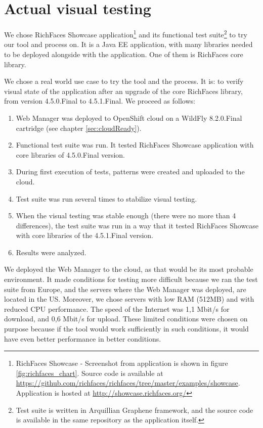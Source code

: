 \documentclass[11pt,oneside,final]{fithesis2}
\begin{document}
  \section{Actual visual testing}
  We chose RichFaces Showcase 
  application\footnote{RichFaces Showcase - Screenshot from application is shown in figure \ref{fig:richfaces_chart}. 
  Source code is available at \url{https://github.com/richfaces/richfaces/tree/master/examples/showcase}. 
  Application is hosted at \url{http://showcase.richfaces.org/}} 
  and its functional test suite\footnote{Test suite is written in Arquillian Graphene framework, and the source code is 
  available in the same repository as the application itself.} to try our tool and process on. It is a Java EE application, with
  many libraries needed to be deployed alongside with the application. One of them is RichFaces core library.
  
  We chose a real world use case to try the tool and the process. It is: to verify visual state of the application after an upgrade of 
  the core RichFaces library, from version 4.5.0.Final to 4.5.1.Final. We proceed as follows:
  
  \begin{enumerate}
   \item Web Manager was deployed to OpenShift cloud on a WildFly 8.2.0.Final cartridge (see chapter \ref{sec:cloudReady}).
   \item Functional test suite was run. It tested RichFaces Showcase application with core libraries of 4.5.0.Final version.
   \item During first execution of tests, patterns were created and uploaded to the cloud.
   \item Test suite was run several times to stabilize visual testing.
   \item When the visual testing was stable enough (there were no more than 4 differences), the test suite was run in a way that it
   tested RichFaces Showcase with core libraries of the 4.5.1.Final version.
   \item Results were analyzed.
  \end{enumerate}
  
  We deployed the Web Manager to the cloud, as that would be its most probable environment. It made conditions for testing more
  difficult because we ran the test suite from Europe, and the servers where the Web Manager was deployed, are located in the US.
  Moreover, we chose servers with low RAM (512MB) and with reduced CPU performance. The speed of the Internet was 1,1 Mbit/s
  for download, and 0,6 Mbit/s for upload. These limited conditions were chosen on purpose because if the tool would work 
  sufficiently in such conditions, it would have even better performance in better conditions.
  
\end{document}
